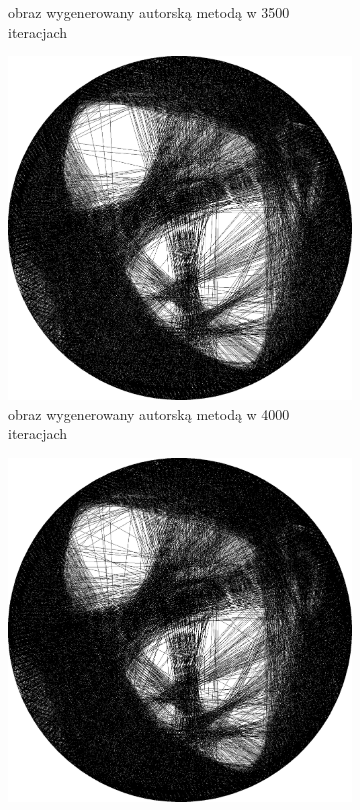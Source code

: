 \documentclass[a4paper, 12pt, polish, twoside]{extreport}
\begin{document}
\begin{figure}[H]
\begin{subfigure}{0.24\textwidth}
        \caption{obraz wygenerowany autorską metodą w 3500 iteracjach}
        \label{comp-comp-magdalene-i}
    \end{subfigure}
    \begin{subfigure}{0.24\textwidth}
        \centering
        \includegraphics[width = \textwidth]{img/6-comp/magdalene_e_i4000_c20_inv0_bg1_obj2_ed1.png}
        \caption{obraz wygenerowany autorską metodą w 4000 iteracjach}
        \label{comp-comp-magdalene-j}
    \end{subfigure}
    \begin{subfigure}{0.24\textwidth}
        \centering
        \includegraphics[width = \textwidth]{img/6-comp/magdalene_e_i4500_c20_inv0_bg1_obj2_ed1.png}

\end{subfigure}
\end{figure}
\end{document}
